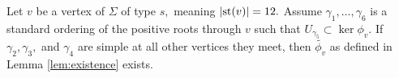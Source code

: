 \documentclass[class=book, crop=false]{standalone}
\begin{document}
%
%
\begin{lemma} 
	\label{lem:336f2ex}
	Let $v$ be a vertex of $\Sigma$ of type $s,$ meaning $|\mathrm{st}(v)|=12.$ Assume $\gamma_1,\dots,\gamma_6$ is a standard ordering of the positive roots through $v$ such that $U_{\gamma_5}\subset \ker \phi_v.$ If $\gamma_2,\gamma_3,$ and $\gamma_4$ are simple at all other vertices they meet, then $\tilde{\phi_v}$ as defined in Lemma \ref{lem:existence} exists.
\end{lemma}
\end{document}
